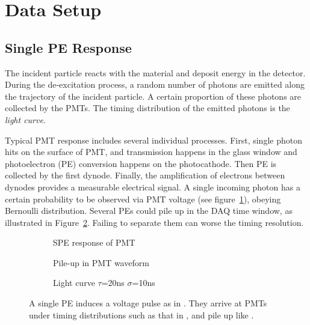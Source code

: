 \section{Data Setup} %
\label{sec:toyMC}

\subsection{Single PE Response}

The incident particle reacts with the material and deposit energy in the detector. During the de-excitation process, a random number of photons are emitted along the trajectory of the incident particle. A certain proportion of these photons are collected by the PMTs. The timing distribution of the emitted photons is the \textit{light curve}. 

Typical PMT response includes several individual processes. First, single photon hits on the surface of PMT, and transmission happens in the glass window and photoelectron (PE) conversion happens on the photocathode. Then PE is collected by the first dynode. Finally, the amplification of electrons between dynodes provides a measurable electrical signal. A single incoming photon has a certain probability to be observed via PMT voltage (see figure~\ref{fig:spe}), obeying Bernoulli distribution. Several PEs could pile up in the DAQ time window, as illustrated in Figure~\ref{fig:pile}.  Failing to separate them can worse the timing resolution.

\begin{figure}[H]
  \begin{subfigure}{.33\textwidth}
    \centering
    \resizebox{\textwidth}{!}{}
    \caption{\label{fig:spe} SPE response of PMT}
  \end{subfigure}
  \begin{subfigure}{.33\textwidth}
    \centering
    \resizebox{\textwidth}{!}{}
    \caption{\label{fig:pile} Pile-up in PMT waveform}
  \end{subfigure}
  \begin{subfigure}{.33\textwidth}
    \centering
    \resizebox{\textwidth}{!}{}
    \caption{\label{fig:time-pro} Light curve $\tau$=20ns $\sigma$=10ns}
  \end{subfigure}
  \caption{A single PE induces a voltage pulse as in .  They arrive at PMTs under timing distributions such as that in , and pile up like .}
\end{figure}

